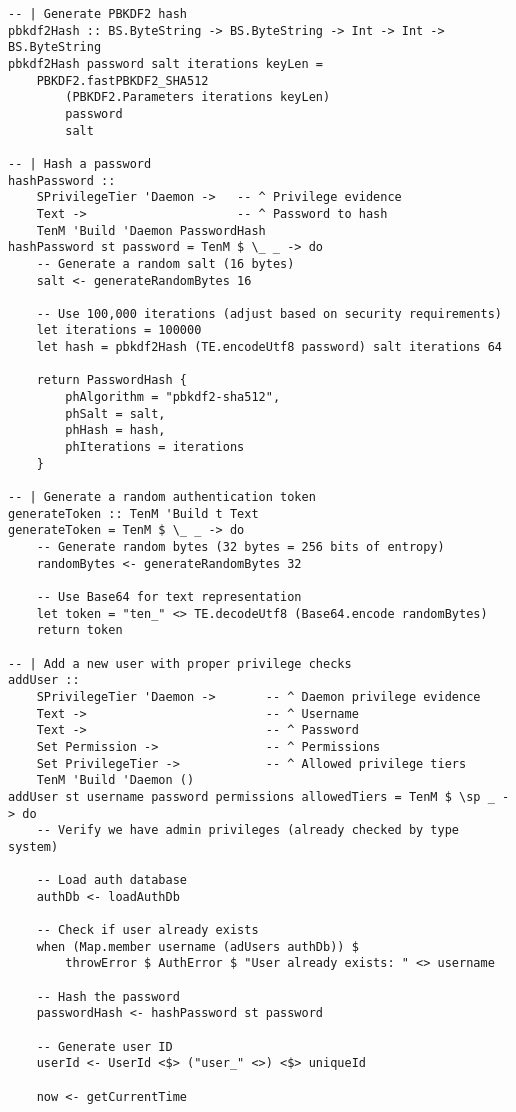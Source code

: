 \documentclass{article}
\begin{document}
\begin{tcolorbox}[title=Ten/Daemon/Auth.hs Changes]
\begin{verbatim}
-- | Generate PBKDF2 hash
pbkdf2Hash :: BS.ByteString -> BS.ByteString -> Int -> Int -> BS.ByteString
pbkdf2Hash password salt iterations keyLen =
    PBKDF2.fastPBKDF2_SHA512
        (PBKDF2.Parameters iterations keyLen)
        password
        salt

-- | Hash a password
hashPassword ::
    SPrivilegeTier 'Daemon ->   -- ^ Privilege evidence
    Text ->                     -- ^ Password to hash
    TenM 'Build 'Daemon PasswordHash
hashPassword st password = TenM $ \_ _ -> do
    -- Generate a random salt (16 bytes)
    salt <- generateRandomBytes 16

    -- Use 100,000 iterations (adjust based on security requirements)
    let iterations = 100000
    let hash = pbkdf2Hash (TE.encodeUtf8 password) salt iterations 64

    return PasswordHash {
        phAlgorithm = "pbkdf2-sha512",
        phSalt = salt,
        phHash = hash,
        phIterations = iterations
    }

-- | Generate a random authentication token
generateToken :: TenM 'Build t Text
generateToken = TenM $ \_ _ -> do
    -- Generate random bytes (32 bytes = 256 bits of entropy)
    randomBytes <- generateRandomBytes 32

    -- Use Base64 for text representation
    let token = "ten_" <> TE.decodeUtf8 (Base64.encode randomBytes)
    return token

-- | Add a new user with proper privilege checks
addUser ::
    SPrivilegeTier 'Daemon ->       -- ^ Daemon privilege evidence
    Text ->                         -- ^ Username
    Text ->                         -- ^ Password
    Set Permission ->               -- ^ Permissions
    Set PrivilegeTier ->            -- ^ Allowed privilege tiers
    TenM 'Build 'Daemon ()
addUser st username password permissions allowedTiers = TenM $ \sp _ -> do
    -- Verify we have admin privileges (already checked by type system)

    -- Load auth database
    authDb <- loadAuthDb

    -- Check if user already exists
    when (Map.member username (adUsers authDb)) $
        throwError $ AuthError $ "User already exists: " <> username

    -- Hash the password
    passwordHash <- hashPassword st password

    -- Generate user ID
    userId <- UserId <$> ("user_" <>) <$> uniqueId

    now <- getCurrentTime


\end{verbatim}
\end{tcolorbox}
\end{document}
